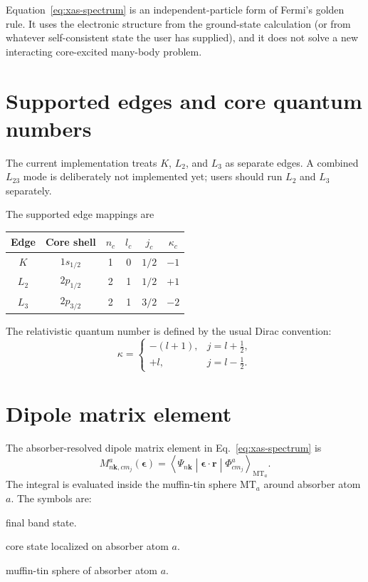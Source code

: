 \documentclass[11pt,a4paper]{article}
\newcommand{\kvec}{\mathbf{k}}
\newcommand{\rvec}{\mathbf{r}}
\newcommand{\epsvec}{\boldsymbol{\epsilon}}
\newcommand{\mt}{\mathrm{MT}}
\newcommand{\absr}{a}
\begin{document}
Equation~\eqref{eq:xas-spectrum} is an independent-particle form of Fermi's
golden rule. It uses the electronic structure from the ground-state calculation
(or from whatever self-consistent state the user has supplied), and it does not
solve a new interacting core-excited many-body problem.

\section{Supported edges and core quantum numbers}

The current implementation treats \(K\), \(L_2\), and \(L_3\) as separate
edges. A combined \(L_{23}\) mode is deliberately not implemented yet; users
should run \(L_2\) and \(L_3\) separately.

The supported edge mappings are
\begin{center}
\begin{tabular}{c c c c c c}
\hline
Edge & Core shell & \(n_c\) & \(l_c\) & \(j_c\) & \(\kappa_c\) \\
\hline
\(K\)   & \(1s_{1/2}\) & 1 & 0 & \(1/2\) & \(-1\) \\
\(L_2\) & \(2p_{1/2}\) & 2 & 1 & \(1/2\) & \(+1\) \\
\(L_3\) & \(2p_{3/2}\) & 2 & 1 & \(3/2\) & \(-2\) \\
\hline
\end{tabular}
\end{center}
The relativistic quantum number is defined by the usual Dirac convention:
\begin{equation}
  \kappa =
  \begin{cases}
    -(l+1), & j=l+\frac12,\\[3pt]
    +l, & j=l-\frac12 .
  \end{cases}
\end{equation}

\section{Dipole matrix element}

The absorber-resolved dipole matrix element in Eq.~\eqref{eq:xas-spectrum} is
\begin{equation}
\label{eq:matrix-element}
  M^{\absr}_{n\kvec,c m_j}(\epsvec)
  =
  \left\langle
     \Psi_{n\kvec}
  \middle|
     \epsvec\cdot\rvec
  \middle|
     \Phi^{\absr}_{c m_j}
  \right\rangle_{\mt_{\absr}} .
\end{equation}
The integral is evaluated inside the muffin-tin sphere \(\mt_{\absr}\) around
absorber atom \(\absr\). The symbols are:
\begin{description}[leftmargin=2.7cm,style=nextline]
  \item[\(\Psi_{n\kvec}\)] final band state.
  \item[\(\Phi^{\absr}_{c m_j}\)] core state localized on absorber atom \(\absr\).
  \item[\(\mt_{\absr}\)] muffin-tin sphere of absorber atom \(\absr\).
\end{description}
\end{document}
